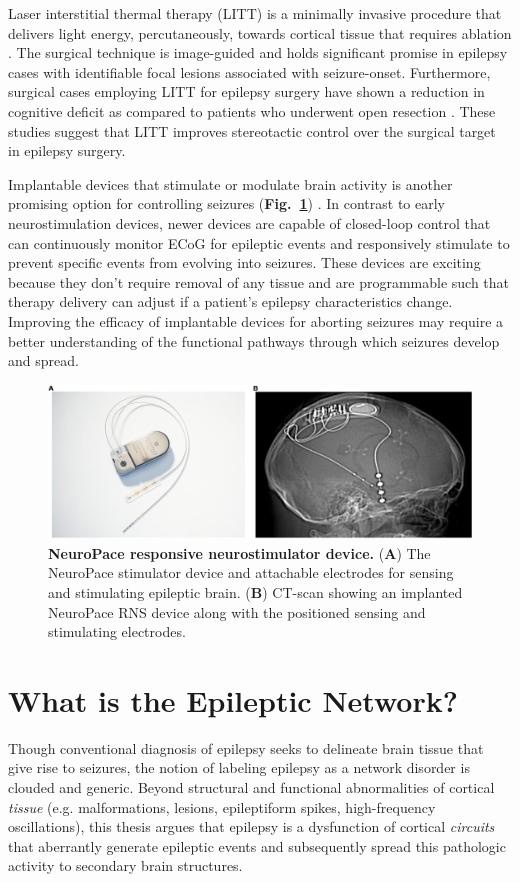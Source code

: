 Laser interstitial thermal therapy (LITT) is a minimally invasive procedure that delivers light energy, percutaneously, towards cortical tissue that requires ablation \cite{tovar-spinoza2013use, medvid2015current}. The surgical technique is image-guided and holds significant promise in epilepsy cases with identifiable focal lesions associated with seizure-onset. Furthermore, surgical cases employing LITT for epilepsy surgery have shown a reduction in cognitive deficit as compared to patients who underwent open resection \cite{drane2015better}. These studies suggest that LITT improves stereotactic control over the surgical target in epilepsy surgery.

Implantable devices that stimulate or modulate brain activity is another promising option for controlling seizures (\textbf{Fig.~\ref{implantable_devices}}) \cite{morrell2011responsive}. In contrast to early neurostimulation devices, newer devices are capable of closed-loop control that can continuously monitor ECoG for epileptic events and responsively stimulate to prevent specific events from evolving into seizures. These devices are exciting because they don't require removal of any tissue and are programmable such that therapy delivery can adjust if a patient's epilepsy characteristics change. Improving the efficacy of implantable devices for aborting seizures may require a better understanding of the functional pathways through which seizures develop and spread. 

\begin{figure}
\centering
\includegraphics[width=\textwidth]{implantable_devices}
\caption[NeuroPace RNS device]{\textbf{NeuroPace responsive neurostimulator device.} (\textbf{A}) The NeuroPace stimulator device and attachable electrodes for sensing and stimulating epileptic brain. (\textbf{B}) CT-scan showing an implanted NeuroPace RNS device along with the positioned sensing and stimulating electrodes.}
\label{implantable_devices}
\end{figure}

\section{What is the Epileptic Network?}
Though conventional diagnosis of epilepsy seeks to delineate brain tissue that give rise to seizures, the notion of labeling epilepsy as a network disorder is clouded and generic. Beyond structural and functional abnormalities of cortical \textit{tissue} (e.g. malformations, lesions, epileptiform spikes, high-frequency oscillations), this thesis argues that epilepsy is a dysfunction of cortical \textit{circuits} that aberrantly generate epileptic events and subsequently spread this pathologic activity to secondary brain structures. 

